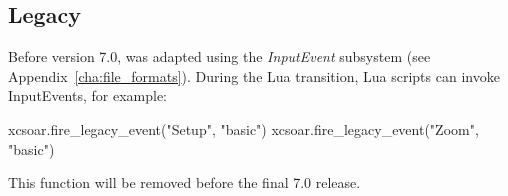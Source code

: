\subsection{Legacy}

Before version 7.0, \xc was adapted using the \emph{InputEvent}
subsystem (see Appendix~\ref{cha:file_formats}).  During the Lua
transition, Lua scripts can invoke InputEvents, for example:

\begin{lua}
xcsoar.fire_legacy_event("Setup", "basic")
xcsoar.fire_legacy_event("Zoom", "basic")
\end{lua}

This function will be removed before the final 7.0 release.
